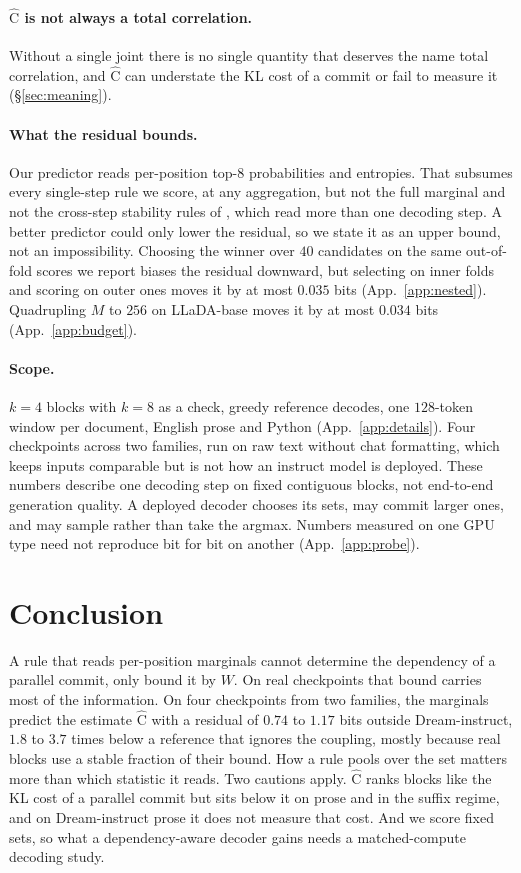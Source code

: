 \documentclass{article}
\newcommand{\C}{\mathrm{C}}
\newcommand{\Chat}{\widehat{\C}}
\begin{document}
\paragraph{$\Chat$ is not always a total correlation.} Without a single joint there is
no single quantity that deserves the name total correlation, and $\Chat$ can understate
the KL cost of a commit or fail to measure it (\S\ref{sec:meaning}).

\paragraph{What the residual bounds.} Our predictor reads per-position top-$8$
probabilities and entropies. That subsumes every single-step rule we score, at any
aggregation, but not the full marginal and not the cross-step stability rules of
\cite{less,stability}, which read more than one decoding step. A better predictor could
only lower the residual, so we state it as an upper bound, not an impossibility. Choosing the winner over $40$
candidates on the same out-of-fold scores we report biases the residual downward, but
selecting on inner folds and scoring on outer ones moves it by at most $0.035$ bits
(App.~\ref{app:nested}). Quadrupling $M$ to $256$ on LLaDA-base moves it by at most
$0.034$ bits (App.~\ref{app:budget}).

\paragraph{Scope.} $k{=}4$ blocks with $k{=}8$ as a check, greedy reference decodes, one
$128$-token window per document, English prose and Python (App.~\ref{app:details}).
Four checkpoints across two families, run on raw text without chat formatting, which
keeps inputs comparable but is not how an instruct model is deployed. These numbers
describe one decoding step on fixed contiguous blocks, not end-to-end generation
quality. A deployed decoder chooses its sets, may commit larger ones, and may sample
rather than take the argmax. Numbers measured on one GPU type need not reproduce bit for bit on
another (App.~\ref{app:probe}).

\section{Conclusion}

A rule that reads per-position marginals cannot determine the dependency of a parallel
commit, only bound it by $W$. On real checkpoints that bound carries most of the
information. On four checkpoints from two families, the marginals predict the estimate
$\Chat$ with a residual of $0.74$ to $1.17$ bits outside Dream-instruct, $1.8$ to $3.7$
times below a reference that ignores the coupling, mostly because real blocks use a
stable fraction of their bound. How a rule pools over the set matters more than which
statistic it reads. Two cautions apply. $\Chat$ ranks blocks like the KL cost of a
parallel commit but sits below it on prose and in the suffix regime, and on
Dream-instruct prose it does not measure that cost. And we score fixed sets, so what a
dependency-aware decoder gains needs a matched-compute decoding study.
\end{document}
